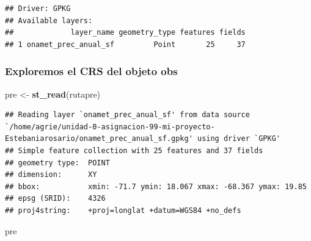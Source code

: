 \documentclass[11pt,]{article}
\newenvironment{Shaded}{\begin{snugshade}}{\end{snugshade}}
\newcommand{\KeywordTok}[1]{\textcolor[rgb]{0.13,0.29,0.53}{\textbf{#1}}}
\newcommand{\StringTok}[1]{\textcolor[rgb]{0.31,0.60,0.02}{#1}}
\newcommand{\NormalTok}[1]{#1}
\begin{document}
\begin{verbatim}
## Driver: GPKG 
## Available layers:
##             layer_name geometry_type features fields
## 1 onamet_prec_anual_sf         Point       25     37
\end{verbatim}

\subsubsection{Exploremos el CRS del objeto
obs}\label{exploremos-el-crs-del-objeto-obs}

\begin{Shaded}
\begin{Highlighting}[]
\NormalTok{pre <-}\StringTok{ }\KeywordTok{st_read}\NormalTok{(rutapre)}
\end{Highlighting}
\end{Shaded}

\begin{verbatim}
## Reading layer `onamet_prec_anual_sf' from data source `/home/agrie/unidad-0-asignacion-99-mi-proyecto-Estebaniarosario/onamet_prec_anual_sf.gpkg' using driver `GPKG'
## Simple feature collection with 25 features and 37 fields
## geometry type:  POINT
## dimension:      XY
## bbox:           xmin: -71.7 ymin: 18.067 xmax: -68.367 ymax: 19.85
## epsg (SRID):    4326
## proj4string:    +proj=longlat +datum=WGS84 +no_defs
\end{verbatim}

\begin{Shaded}
\begin{Highlighting}[]
\NormalTok{pre}
\end{Highlighting}
\end{Shaded}
\end{document}
